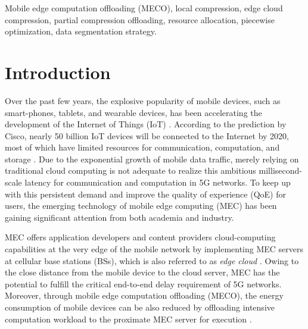 \documentclass[journal,draftcls,onecolumn,12pt,twoside]{IEEEtran}
\begin{document}
\begin{IEEEkeywords}
Mobile edge computation offloading (MECO), local compression, edge cloud compression, partial compression offloading, resource allocation, piecewise optimization, data segmentation strategy.
\end{IEEEkeywords}

\section{Introduction}
Over the past few years, the explosive popularity of mobile devices, such as smart-phones, tablets, and wearable devices, has been accelerating the development of the Internet of Things (IoT) \cite{IoT_development,Fog_and_IoT}. According to the prediction by Cisco, nearly 50 billion IoT devices will be connected to the Internet by 2020, most of which have limited resources for communication, computation, and storage \cite{IoT_devices}. Due to the exponential growth of mobile data traffic, merely relying on traditional cloud computing is not adequate to realize this ambitious millisecond-scale latency for communication and computation in 5G networks. To keep up with this persistent demand and improve the quality of experience (QoE) for users, the emerging technology of mobile edge computing (MEC) has been gaining significant attention from both academia and industry.

MEC offers application developers and content providers cloud-computing capabilities at the very edge of the mobile network by implementing MEC servers at cellular base stations (BSs), which is also referred to as \emph{edge cloud} \cite{MEC_white_paper}. Owing to the close distance from the mobile device to the cloud server, MEC has the potential to fulfill the critical end-to-end delay requirement of 5G networks. Moreover, through mobile edge computation offloading (MECO), the energy consumption of mobile devices can be also reduced by offloading intensive computation workload to the proximate MEC server for execution \cite{MEC_survey}.
\end{document}
